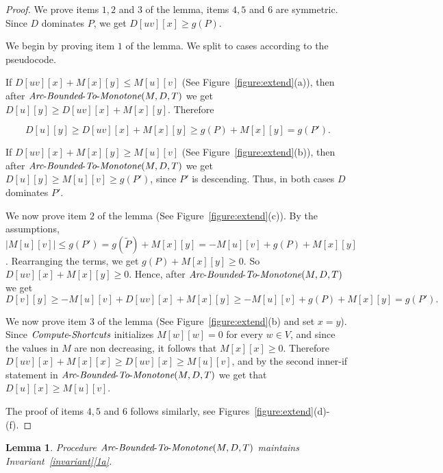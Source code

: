 \documentclass[11pt]{article}
\newtheorem{lemma}[theorem]{Lemma}
\newcommand{\ComputeS}{\mbox{{\it Compute}-{\it Shortcuts}}}
\newcommand{\Extend}{\mbox{{\it Arc}-{\it Bounded}-{\it To}-{\it Monotone}}}
\begin{document}
\begin{proof}
    We prove items $1,2$ and $3$ of the lemma, items $4,5$ and $6  $ are symmetric. Since $D$ dominates $P$, we get $D[u v][x] \ge g(P)$.
    
    We begin by proving item $1$ of the lemma. 
    We split to cases according to the pseudocode.
    
     If $D[u v][x]+ M[x][y] \le M[u][v]$ (See Figure~\ref{figure:extend}(a)), then after $\Extend(M,D,T)$ we get $D[u][y]\ge D[u v][x]+ M[x][y]$. Therefore

     \[ D[u][y]\ge D[u v][x]+ M[x][y] \ge g(P) + M[x][y] = g(P').\]
     
     If $D[u v][x]+ M[x][y] \ge M[u][v]$ (See Figure~\ref{figure:extend}(b)), then after $\Extend(M,D,T)$ we get $D[u][y]\ge  M[u][v] \ge g(P')$, since $P'$ is descending. Thus, in both cases $D$ dominates $P'$. 

    

    We now prove item $2$ of the lemma  (See Figure~\ref{figure:extend}(c)). By the assumptions, $|M[u][v]| \le g(P') = g(\tilde{P}) + M[x][y] =  -M[u][v] + g(P)+M[x][y]$. Rearranging the terms, we get $g(P)+M[x][y]\ge 0$. So $D[u v][x]+M[x][y]\ge 0$. Hence, after $\Extend(M,D,T)$ we get 
    \[D[v][y]\ge - M[u][v] + D[u v][x]+M[x][y] 
    \ge - M[u][v] + g(P) +M[x][y]
    = g(P').\]

    We now prove item $3$ of the lemma (See Figure~\ref{figure:extend}(b) and set $x=y$). Since $\ComputeS$ initializes $M[w][w]=0$ for every $w\in V$, and since the values in $M$ are non decreasing, it follows that $M[x][x]\ge 0$. Therefore $D[uv][x]+M[x][x]\ge D[uv][x]\ge M[u][v]$, and by the second inner-if statement in $\Extend(M,D,T)$ we get that $D[u][x]\ge M[u][v]$.

    The proof of items $4,5$ and $6$ follows similarly, see Figures~\ref{figure:extend}(d)-(f).
\end{proof}

\begin{lemma}\label{lemms:long-shortcuts-invariant}
    Procedure $\Extend(M,D,T)$ maintains Invariant~\ref{invariant}\ref{1a}.
\end{lemma}
\end{document}
